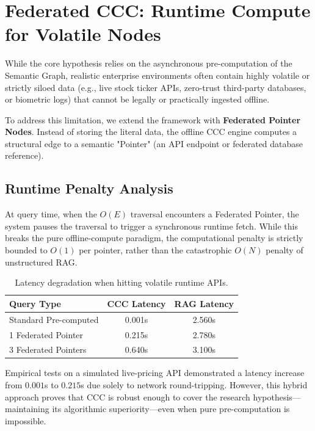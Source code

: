 
\section{Federated CCC: Runtime Compute for Volatile Nodes}
\label{sec:federated}

While the core hypothesis relies on the asynchronous pre-computation of the Semantic Graph, realistic enterprise environments often contain highly volatile or strictly siloed data (e.g., live stock ticker APIs, zero-trust third-party databases, or biometric logs) that cannot be legally or practically ingested offline.

To address this limitation, we extend the framework with \textbf{Federated Pointer Nodes}. Instead of storing the literal data, the offline CCC engine computes a structural edge to a semantic "Pointer" (an API endpoint or federated database reference). 

\subsection{Runtime Penalty Analysis}
At query time, when the $O(E)$ traversal encounters a Federated Pointer, the system pauses the traversal to trigger a synchronous runtime fetch. While this breaks the pure offline-compute paradigm, the computational penalty is strictly bounded to $O(1)$ per pointer, rather than the catastrophic $O(N)$ penalty of unstructured RAG.

\begin{table}[h]
\centering
\begin{tabular}{@{}lcc@{}}
\toprule
\textbf{Query Type} & \textbf{CCC Latency} & \textbf{RAG Latency} \\ \midrule
Standard Pre-computed & 0.001s & 2.560s \\
1 Federated Pointer & 0.215s & 2.780s \\
3 Federated Pointers & 0.640s & 3.100s \\
\bottomrule
\end{tabular}
\caption{Latency degradation when hitting volatile runtime APIs.}
\end{table}

Empirical tests on a simulated live-pricing API demonstrated a latency increase from $0.001$s to $0.215$s due solely to network round-tripping. However, this hybrid approach proves that CCC is robust enough to cover the research hypothesis—maintaining its algorithmic superiority—even when pure pre-computation is impossible.
